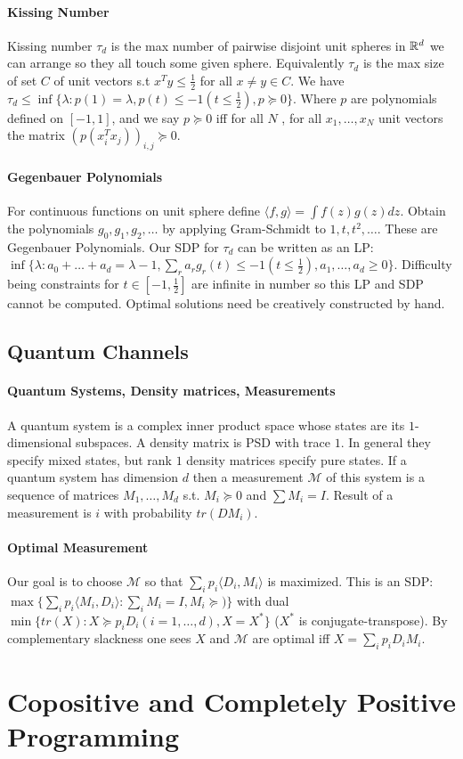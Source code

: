 \documentclass[letterpaper,11pt,oneside,onecolumn]{article}
\newcommand{\cM}{\mathcal{M}} \newcommand{\cN}{\mathcal{N}}
\begin{document}
\paragraph{Kissing Number} Kissing number $\tau_d$ is the max number of pairwise disjoint unit spheres in $\mathbb{R}^d$ we can arrange so they all touch some given sphere. Equivalently $\tau_d$ is the max size of set $C$ of unit vectors s.t $x^Ty\leq \frac{1}{2}$ for all $x\neq y \in C$. We have $\tau_d \leq \inf \{\lambda: p(1) = \lambda, p(t) \leq -1 (t \leq \frac{1}{2}), p \succcurlyeq 0\}$. Where $p$ are polynomials defined on $[-1,1]$, and we say $p\succcurlyeq 0$ iff for all $N$ , for all $x_1,\dots, x_N$ unit vectors the matrix $(p(x_i^Tx_j))_{i,j} \succcurlyeq 0$.
\paragraph{Gegenbauer Polynomials} For continuous functions on unit sphere define $\langle f, g\rangle = \int f(z)g(z) dz$. Obtain the polynomials $g_0, g_1, g_2,\dots$ by applying Gram-Schmidt to $1,t,t^2,\dots$. These are Gegenbauer Polynomials. Our SDP for $\tau_d$ can be written as an LP: $\inf\{\lambda: a_0 + \dots + a_d = \lambda - 1, \sum_r a_r g_r(t) \leq -1 (t\leq \frac{1}{2}), a_1, \dots, a_d \geq 0\}$. Difficulty being constraints for $t\in [-1,\frac{1}{2}]$ are infinite in number so this LP and SDP cannot be computed. Optimal solutions need be creatively constructed by hand.
\subsection*{Quantum Channels}
\paragraph{Quantum Systems, Density matrices, Measurements}A quantum system is a complex inner product space whose states are its $1$-dimensional subspaces. A density matrix is PSD with trace $1$. In general they specify mixed states, but rank $1$ density matrices specify pure states. If a quantum system has dimension $d$ then a measurement $\cM$ of this system is a sequence of matrices $M_1, \dots, M_d$ s.t. $M_i \succcurlyeq 0$ and $\sum M_i = I$. Result of a measurement is $i$ with probability $tr(DM_i)$.
\paragraph{Optimal Measurement}
Our goal is to choose $\cM$ so that $\sum_i p_i \langle D_i, M_i \rangle$ is maximized. This is an SDP: $\max \{\sum_i p_i\langle M_i, D_i \rangle : \sum_i M_i = I, M_i \succcurlyeq )\}$ with dual $\min\{tr(X) : X \succcurlyeq p_iD_i (i =1, \dots, d), X = X^*\}$ ($X^*$ is conjugate-transpose). By complementary slackness one sees $X$ and $\cM$ are optimal iff $X=\sum_i p_iD_iM_i$.
\section*{Copositive and Completely Positive Programming}
\end{document}
